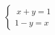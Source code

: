 \documentclass[preview]{standalone}
\begin{document}
\begin{align*}
\left\{ \begin{array}{cl} \ x + y = 1 \\[1pt] 1 - y = x \end{array} \right.
\end{align*}
\end{document}
